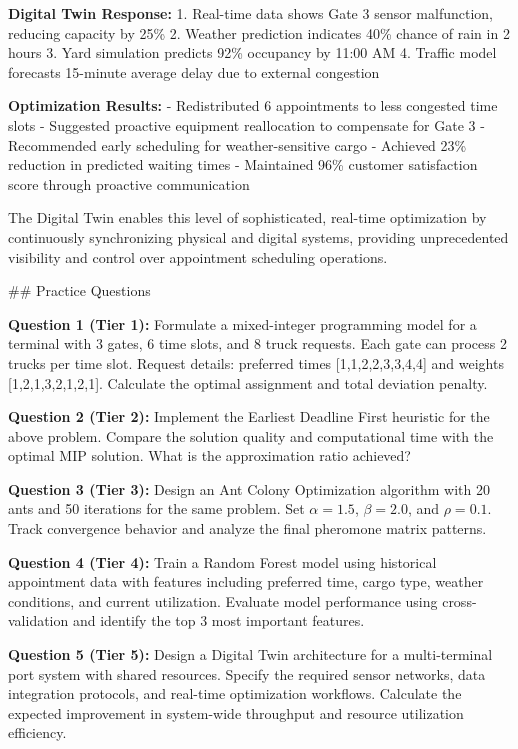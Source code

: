 \documentclass{article}
\begin{document}
\textbf{Digital Twin Response:}
1. Real-time data shows Gate 3 sensor malfunction, reducing capacity by 25\%
2. Weather prediction indicates 40\% chance of rain in 2 hours
3. Yard simulation predicts 92\% occupancy by 11:00 AM
4. Traffic model forecasts 15-minute average delay due to external congestion

\textbf{Optimization Results:}
- Redistributed 6 appointments to less congested time slots
- Suggested proactive equipment reallocation to compensate for Gate 3
- Recommended early scheduling for weather-sensitive cargo
- Achieved 23\% reduction in predicted waiting times
- Maintained 96\% customer satisfaction score through proactive communication

The Digital Twin enables this level of sophisticated, real-time optimization by continuously synchronizing physical and digital systems, providing unprecedented visibility and control over appointment scheduling operations.

## Practice Questions

\textbf{Question 1 (Tier 1):} Formulate a mixed-integer programming model for a terminal with 3 gates, 6 time slots, and 8 truck requests. Each gate can process 2 trucks per time slot. Request details: preferred times [1,1,2,2,3,3,4,4] and weights [1,2,1,3,2,1,2,1]. Calculate the optimal assignment and total deviation penalty.

\textbf{Question 2 (Tier 2):} Implement the Earliest Deadline First heuristic for the above problem. Compare the solution quality and computational time with the optimal MIP solution. What is the approximation ratio achieved?

\textbf{Question 3 (Tier 3):} Design an Ant Colony Optimization algorithm with 20 ants and 50 iterations for the same problem. Set $\alpha = 1.5$, $\beta = 2.0$, and $\rho = 0.1$. Track convergence behavior and analyze the final pheromone matrix patterns.

\textbf{Question 4 (Tier 4):} Train a Random Forest model using historical appointment data with features including preferred time, cargo type, weather conditions, and current utilization. Evaluate model performance using cross-validation and identify the top 3 most important features.

\textbf{Question 5 (Tier 5):} Design a Digital Twin architecture for a multi-terminal port system with shared resources. Specify the required sensor networks, data integration protocols, and real-time optimization workflows. Calculate the expected improvement in system-wide throughput and resource utilization efficiency.
\end{document}
